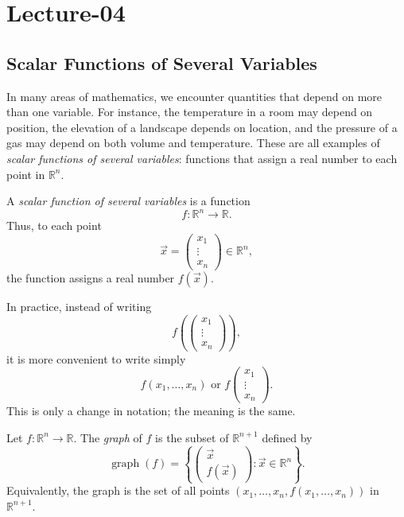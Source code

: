 \newpage
\section{Lecture-04}
\subsection{Scalar Functions of Several Variables}

In many areas of mathematics, we encounter quantities that depend on more than one variable. For instance, the temperature in a room may depend on position, the elevation of a landscape depends on location, and the pressure of a gas may depend on both volume and temperature. These are all examples of \emph{scalar functions of several variables}: functions that assign a real number to each point in $\mathbb{R}^n$.

\begin{definition}
A \emph{scalar function of several variables} is a function
\[
f:\mathbb{R}^n\to\mathbb{R}.
\]
Thus, to each point
\[
\vec x=
\begin{pmatrix}
x_1\\
\vdots\\
x_n
\end{pmatrix}
\in\mathbb{R}^n,
\]
the function assigns a real number $f(\vec x)$.

In practice, instead of writing
\[
f\left(
\begin{pmatrix}
x_1\\
\vdots\\
x_n
\end{pmatrix}
\right),
\]
it is more convenient to write simply
\[
f(x_1,\dots,x_n) \text{ or } f\begin{pmatrix}
x_1\\
\vdots\\
x_n
\end{pmatrix}.
\]
This is only a change in notation; the meaning is the same.
\end{definition}

\begin{definition}
Let $f:\mathbb{R}^n\to\mathbb{R}$. The \emph{graph} of $f$ is the subset of $\mathbb{R}^{n+1}$ defined by
\[
\operatorname{graph}(f)
=
\left\{
\begin{pmatrix}
\vec x\\
f(\vec x)
\end{pmatrix}
: \vec x\in\mathbb{R}^n
\right\}.
\]
Equivalently, the graph is the set of all points $(x_1,\dots,x_n,f(x_1,\dots,x_n))$ in $\mathbb{R}^{n+1}$.
\end{definition}

